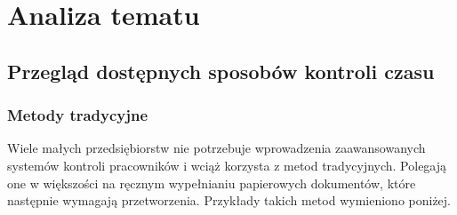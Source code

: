 





\chapter{Analiza tematu}



\section{Przegląd dostępnych sposobów kontroli czasu}

\subsection{Metody tradycyjne}

Wiele małych przedsiębiorstw nie potrzebuje wprowadzenia zaawansowanych systemów kontroli pracowników i wciąż korzysta z metod tradycyjnych. Polegają one w większości na ręcznym wypełnianiu papierowych dokumentów, które następnie wymagają przetworzenia. Przykłady takich metod wymieniono poniżej.

